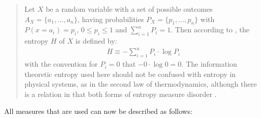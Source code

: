 \begin{quote}
Let $X$ be a random variable with a set of possible outcomes $A_X=\{a_1,\ldots,a_n\}$, having probabilities $P_X=\{p_1,\ldots,p_n\}$ with $P(x=a_i)=p_i$, $0 \leq p_i \leq 1$ and $\sum_{i=1}^n P_i = 1$. Then according to \citet{shannon:1948}, the entropy $H$ of $X$ is defined by:
\begin{eqnarray}
H \equiv -\sum_{i=1}^n P_i \cdot \log P_i
\end{eqnarray}
with the convention for $P_i=0$ that $-0 \cdot \log 0 = 0$. The information theoretic entropy used here should not be confused with entropy in physical systems, as in the second law of thermodynamics, although there is a relation in that both forms of entropy measure disorder \citep[76]{dejong:2000}.
\end{quote}


\noindent All measures that are used can now be described as follows:

